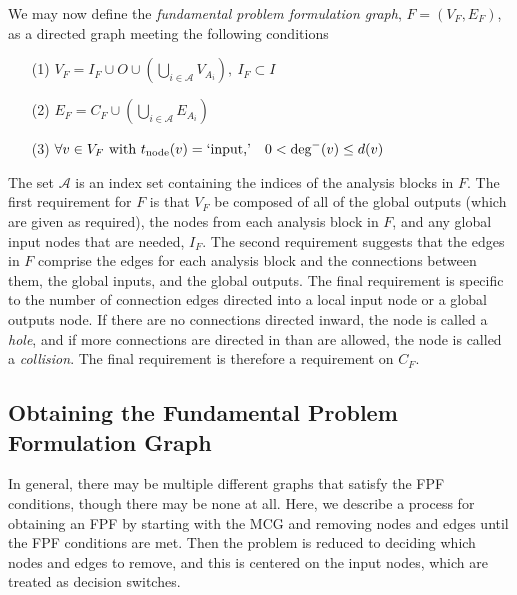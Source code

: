 We may now define the \emph{fundamental problem formulation graph}, $F=(V_F,E_F)$, as a directed graph meeting the following conditions
\begin{enumerate}
\item[(1)] $\displaystyle{V_F = I_F \cup O \cup \left( \bigcup_{i \in \mathcal A} V_{A_i} \right),\ I_F \subset I}$
\item[(2)] $\displaystyle{E_F = C_F \cup \left( \bigcup_{i \in \mathcal A} E_{A_i} \right)}$
\item[(3)] $\displaystyle{\forall v \in V_F \textrm{ with } t_\textrm{node}(v) = \textrm{`input,'}\quad 0 < \textrm{deg}^-(v) \leq d(v)}$
\end{enumerate}
The set $\mathcal A$ is an index set containing the indices of the analysis blocks in $F$. The first requirement for $F$ is that $V_F$ be composed of all of the global outputs (which are given as required), the nodes from each analysis block in $F$, and any global input nodes that are needed, $I_F$. The second requirement suggests that the edges in $F$ comprise the edges for each analysis block and the connections between them, the global inputs, and the global outputs. The final requirement is specific to the number of connection edges directed into a local input node or a global outputs node. If there are no connections directed inward, the node is called a \emph{hole}, and if more connections are directed in than are allowed, the node is called a \emph{collision}. The final requirement is therefore a requirement on $C_F$.

\subsection{Obtaining the Fundamental Problem Formulation Graph}
In general, there may be multiple different graphs that satisfy the FPF conditions, though there may be none at all. Here, we describe a process for obtaining an FPF by starting with the MCG and removing nodes and edges until the FPF conditions are met. Then the problem is reduced to deciding which nodes and edges to remove, and this is centered on the input nodes, which are treated as decision switches.

